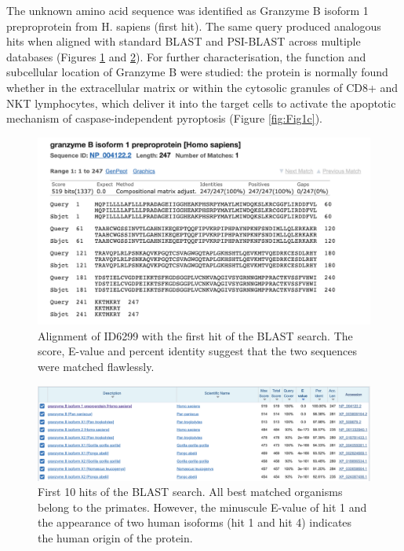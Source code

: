 \documentclass[
]{article}
\begin{document}
The unknown amino acid sequence was identified as Granzyme B isoform 1 preproprotein from H. sapiens (first hit). The same query produced analogous hits when aligned with standard BLAST and PSI-BLAST across multiple databases (Figures \ref{fig:Fig1a} and \ref{fig:Fig1b}). For further characterisation, the function and subcellular location of Granzyme B were studied: the protein is normally found whether in the extracellular matrix or within the cytosolic granules of CD8+ and NKT lymphocytes, which deliver it into the target cells to activate the apoptotic mechanism of caspase-independent pyroptosis (Figure \ref{fig:Fig1c}).

\begin{figure}

{\centering \includegraphics[width=0.8\linewidth]{protein identification/BLAST identification} 

}

\caption{Alignment of ID6299 with the first hit of the BLAST search. The score, E-value and percent identity suggest that the two sequences were matched flawlessly.}\label{fig:Fig1a}
\end{figure}

\begin{figure}

{\centering \includegraphics[width=0.8\linewidth]{protein identification/first_10_hits} 

}

\caption{First 10 hits of the BLAST search. All best matched organisms belong to the primates. However, the minuscule E-value of hit 1 and the appearance of two human isoforms (hit 1 and hit 4) indicates the human origin of the protein.}\label{fig:Fig1b}
\end{figure}
\end{document}
